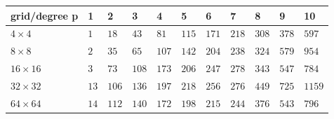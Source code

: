 \begin{tabular}{lllllllllll}
\hline
 grid/degree p   & 1    & 2     & 3     & 4     & 5     & 6     & 7     & 8     & 9     & 10     \\
\hline
 $4 \times 4$    & $1$  & $18$  & $43$  & $81$  & $115$ & $171$ & $218$ & $308$ & $378$ & $597$  \\
 $8 \times 8$    & $2$  & $35$  & $65$  & $107$ & $142$ & $204$ & $238$ & $324$ & $579$ & $954$  \\
 $16 \times 16$  & $3$  & $73$  & $108$ & $173$ & $206$ & $247$ & $278$ & $343$ & $547$ & $784$  \\
 $32 \times 32$  & $13$ & $106$ & $136$ & $197$ & $218$ & $256$ & $276$ & $449$ & $725$ & $1159$ \\
 $64 \times 64$  & $14$ & $112$ & $140$ & $172$ & $198$ & $215$ & $244$ & $376$ & $543$ & $796$  \\
\hline
\end{tabular}